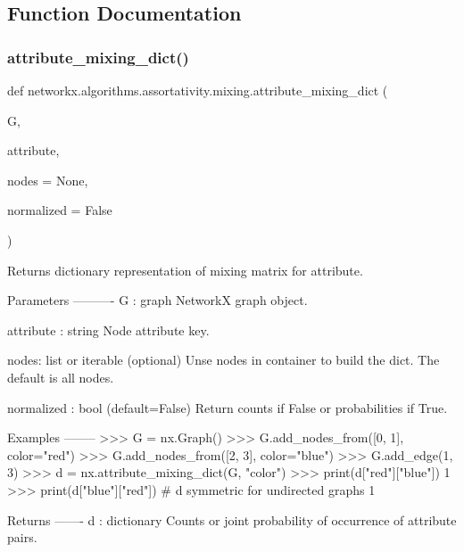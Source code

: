 \subsection{Function Documentation}
\mbox{\label{namespacenetworkx_1_1algorithms_1_1assortativity_1_1mixing_a531602d98d63ca449a3990b09e047922}} 
\subsubsection{\texorpdfstring{attribute\+\_\+mixing\+\_\+dict()}{attribute\_mixing\_dict()}}
{\footnotesize\ttfamily def networkx.\+algorithms.\+assortativity.\+mixing.\+attribute\+\_\+mixing\+\_\+dict (\begin{DoxyParamCaption}\item[{}]{G,  }\item[{}]{attribute,  }\item[{}]{nodes = {\ttfamily None},  }\item[{}]{normalized = {\ttfamily False} }\end{DoxyParamCaption})}

\begin{DoxyVerb}Returns dictionary representation of mixing matrix for attribute.

Parameters
----------
G : graph
   NetworkX graph object.

attribute : string
   Node attribute key.

nodes: list or iterable (optional)
    Unse nodes in container to build the dict. The default is all nodes.

normalized : bool (default=False)
   Return counts if False or probabilities if True.

Examples
--------
>>> G = nx.Graph()
>>> G.add_nodes_from([0, 1], color="red")
>>> G.add_nodes_from([2, 3], color="blue")
>>> G.add_edge(1, 3)
>>> d = nx.attribute_mixing_dict(G, "color")
>>> print(d["red"]["blue"])
1
>>> print(d["blue"]["red"])  # d symmetric for undirected graphs
1

Returns
-------
d : dictionary
   Counts or joint probability of occurrence of attribute pairs.
\end{DoxyVerb}
 \mbox{\label{namespacenetworkx_1_1algorithms_1_1assortativity_1_1mixing_a0fde3db1cb7c55c5e8a3481f39f37707}} 
